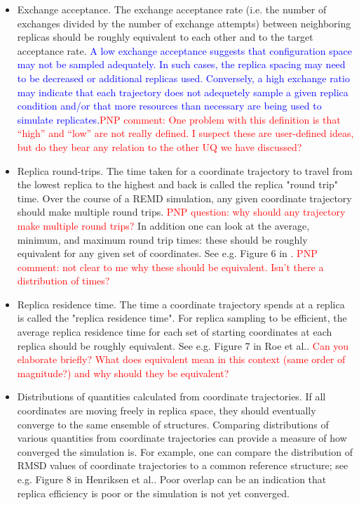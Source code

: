 \begin{itemize}
  \item Exchange acceptance. The exchange acceptance rate (i.e. the number of exchanges divided by the number of exchange attempts) between neighboring replicas should be roughly equivalent to each other and to the target acceptance rate. \textcolor{blue}{A low exchange acceptance suggests that configuration space may not be sampled adequately.  In such cases, the  replica spacing may need to be decreased or additional replicas used.  Conversely, a high exchange ratio may indicate that each trajectory does not adequetely sample a given replica condition and/or that more resources than necessary are being used to simulate replicates.}\textcolor{red}{PNP comment: One problem with this definition is that ``high'' and ``low'' are not really defined.  I suspect these are user-defined ideas, but do they bear any relation to the other UQ we have discussed?}
  \item Replica round-trips. The time taken for a coordinate trajectory to travel from the lowest replica to the highest and back is called the replica "round trip" time. Over the course of a REMD simulation, any given coordinate trajectory should make multiple round trips.  \textcolor{red}{PNP question: why should any trajectory make multiple round trips?} In addition one can look at the average, minimum, and maximum round trip times: these should be roughly equivalent for any given set of coordinates. See e.g. Figure 6 in \citep{Roe2014}.  \textcolor{red}{PNP comment: not clear to me why these should be equivalent.  Isn't there a distribution of times?}
  \item Replica residence time. The time a coordinate trajectory spends at a replica is called the "replica residence time". For replica sampling to be efficient, the average replica residence time for each set of starting coordinates at each replica should be roughly equivalent. See e.g. Figure 7 in Roe et al..\citep{Roe2014}  \textcolor{red}{Can you elaborate briefly?  What does equivalent mean in this context (same order of magnitude?) and why should they be equivalent?}
  \item Distributions of quantities calculated from coordinate trajectories. If all coordinates are moving freely in replica space, they should eventually converge to the same ensemble of structures. Comparing distributions of various quantities from coordinate trajectories can provide a measure of how converged the simulation is. For example, one can compare the distribution of RMSD values of coordinate trajectories to a common reference structure; see e.g. Figure 8 in Henriksen et al..\citep{Henriksen2013} Poor overlap can be an indication that replica efficiency is poor or the simulation is not yet converged.
\end{itemize}

